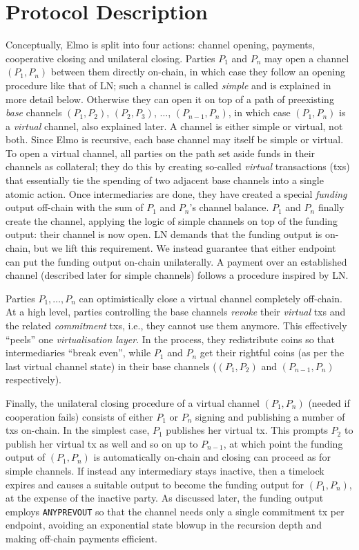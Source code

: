 \section{Protocol Description}
  Conceptually, Elmo is split into four actions: channel opening,
  payments, cooperative closing and unilateral closing. Parties $P_1$ and $P_n$
  may open a channel $(P_1, P_n)$ between them directly on-chain, in which case
  they follow an opening procedure like that of LN; such a channel is called
  \emph{simple} and is explained in more detail below.
  Otherwise they can open it on top of a path
  of preexisting \emph{base} channels $(P_1, P_2)$, $(P_2, P_3)$, $\dots$,
  $(P_{n-1}, P_{n})$, in which case $(P_1, P_n)$ is a \emph{virtual}
  channel, also explained later. A channel is either simple or virtual, not both. Since Elmo is
  recursive, each base channel may itself be simple or
  virtual. To open a virtual
  channel, all parties on the
  path set aside funds in their channels as
  collateral; they do this
  by creating so-called \emph{virtual} transactions (txs) that essentially
  tie the spending of two adjacent base channels into a single atomic action.
  Once intermediaries are done, they have created a special \emph{funding}
  output off-chain with the sum of $P_1$ and $P_n$'s channel
  balance. $P_1$ and $P_n$
  finally create the channel, applying the logic of simple channels on top of
  the funding output: their channel is now open. LN demands that the funding
  output is on-chain, but we lift this requirement. We instead guarantee that
  either endpoint can put the funding output on-chain unilaterally.
  A payment over an established channel (described later for simple channels) follows a procedure inspired by
  LN.

  Parties $P_1, \dots, P_n$ can optimistically close a virtual channel
  completely off-chain. At a high
  level, parties controlling the base channels \emph{revoke} their \emph{virtual}
  txs and the related \emph{commitment} txs, i.e., they cannot use them
  anymore. This effectively ``peels'' one \emph{virtualisation layer}.
  In the process, they redistribute coins so that intermediaries ``break even'',
  while $P_1$
  and $P_n$ get their rightful coins (as per the last virtual channel
  state) in their base channels ($(P_1, P_2)$ and $(P_{n-1}, P_n)$ respectively).

  Finally, the unilateral closing procedure of a virtual channel $(P_1, P_n)$
  (needed if cooperation fails)
  consists of either $P_1$ or $P_n$ signing and publishing a number of
  txs on-chain. In the simplest case, $P_1$ publishes her virtual tx. This
  prompts $P_2$ to publish her
  virtual tx as well and so on up to $P_{n-1}$, at which point the
  funding output of $(P_1, P_n)$ is automatically on-chain and closing can
  proceed as for simple channels. If instead any intermediary stays inactive, then a timelock
  expires and causes a suitable output to become the funding output for $(P_1,
  P_n)$, at
  the expense of the inactive party. As discussed later, the funding output
  employs \texttt{ANYPREVOUT} so that the channel needs only a
  single commitment tx per endpoint, avoiding an exponential state blowup in the
  recursion depth and making off-chain payments efficient.

